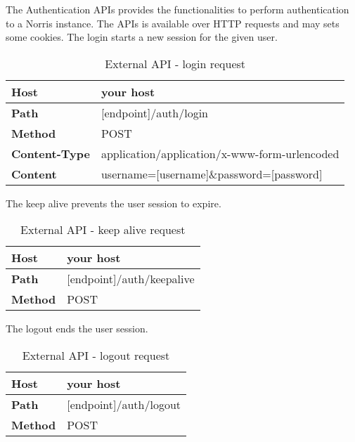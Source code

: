         The Authentication APIs provides the functionalities to perform authentication to a Norris instance. The APIs is available over HTTP requests and may sets some cookies.
            The login starts a new session for the given user. \\
            \begin{table}[H]
                \centering
                \begin{tabu}{|l|l|}
                    \hline
                    \textbf{Host} & your host \\ \hline
                    \textbf{Path} & [endpoint]/auth/login \\ \hline
                    \textbf{Method} & POST \\ \hline
                    \textbf{Content-Type} & application/application/x-www-form-urlencoded \\ \hline
                    \textbf{Content} & username=[username]\&password=[password] \\ \hline
                \end{tabu}
                \caption{External API - login request}
            \end{table}
            The keep alive prevents the user session to expire. \\
            \begin{table}[H]
                \centering
                \begin{tabu}{|l|l|}
                    \hline
                    \textbf{Host} & your host \\ \hline
                    \textbf{Path} & [endpoint]/auth/keepalive \\ \hline
                    \textbf{Method} & POST \\ \hline
                \end{tabu}
                \caption{External API - keep alive request}
            \end{table}
            The logout ends the user session. \\
            \begin{table}[H]
                \centering
                \begin{tabu}{|l|l|}
                    \hline
                    \textbf{Host} & your host \\ \hline
                    \textbf{Path} & [endpoint]/auth/logout \\ \hline
                    \textbf{Method} & POST \\ \hline
                \end{tabu}
                \caption{External API - logout request}
            \end{table}